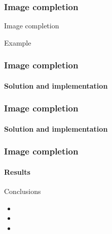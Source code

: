\documentclass[11pt]{beamer}
\begin{document}
\begin{frame}
\frametitle{Image completion}

\begin{block}{Image completion}

\end{block}

\begin{exampleblock}{Example}
\end{exampleblock}
\end{frame}

\begin{frame}
\frametitle{Image completion}
\framesubtitle{Solution and implementation}

\end{frame}

\begin{frame}
\frametitle{Image completion}
\framesubtitle{Solution and implementation}

\end{frame}

\begin{frame}
\frametitle{Image completion}
\framesubtitle{Results}

\end{frame}


\begin{frame}{Conclusions}
\begin{itemize}
\item
\item
\item
\end{itemize}
\end{frame}
\end{document}
